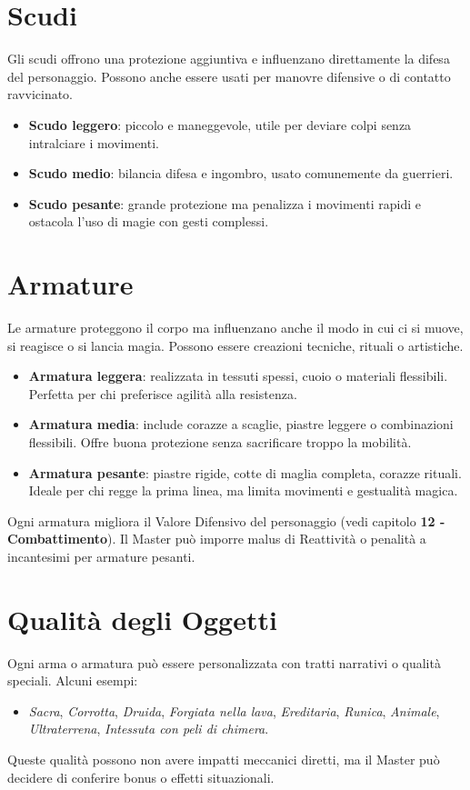 \documentclass[../manuale_main.tex]{subfiles}
\begin{document}
\section{Scudi}

\noindent
Gli scudi offrono una protezione aggiuntiva e influenzano direttamente la difesa del personaggio. Possono anche essere usati per manovre difensive o di contatto ravvicinato.

\begin{itemize}
  \item \textbf{Scudo leggero}: piccolo e maneggevole, utile per deviare colpi senza intralciare i movimenti.
  \item \textbf{Scudo medio}: bilancia difesa e ingombro, usato comunemente da guerrieri.
  \item \textbf{Scudo pesante}: grande protezione ma penalizza i movimenti rapidi e ostacola l’uso di magie con gesti complessi.
\end{itemize}

\section{Armature}
Le armature proteggono il corpo ma influenzano anche il modo in cui ci si muove, si reagisce o si lancia magia. Possono essere creazioni tecniche, rituali o artistiche.

\begin{itemize}
  \item \textbf{Armatura leggera}: realizzata in tessuti spessi, cuoio o materiali flessibili. Perfetta per chi preferisce agilità alla resistenza.
  \item \textbf{Armatura media}: include corazze a scaglie, piastre leggere o combinazioni flessibili. Offre buona protezione senza sacrificare troppo la mobilità.
  \item \textbf{Armatura pesante}: piastre rigide, cotte di maglia completa, corazze rituali. Ideale per chi regge la prima linea, ma limita movimenti e gestualità magica.
\end{itemize}

Ogni armatura migliora il Valore Difensivo del personaggio (vedi capitolo  \textbf{12 - Combattimento}). Il Master può imporre malus di Reattività o penalità a incantesimi per armature pesanti.

\section*{Qualità degli Oggetti}

Ogni arma o armatura può essere personalizzata con tratti narrativi o qualità speciali. Alcuni esempi:

\begin{itemize}
  \item \emph{Sacra}, \emph{Corrotta}, \emph{Druida}, \emph{Forgiata nella lava}, \emph{Ereditaria}, \emph{Runica}, \emph{Animale}, \emph{Ultraterrena}, \emph{Intessuta con peli di chimera}.
\end{itemize}

Queste qualità possono non avere impatti meccanici diretti, ma il Master può decidere di conferire bonus o effetti situazionali.
\end{document}
